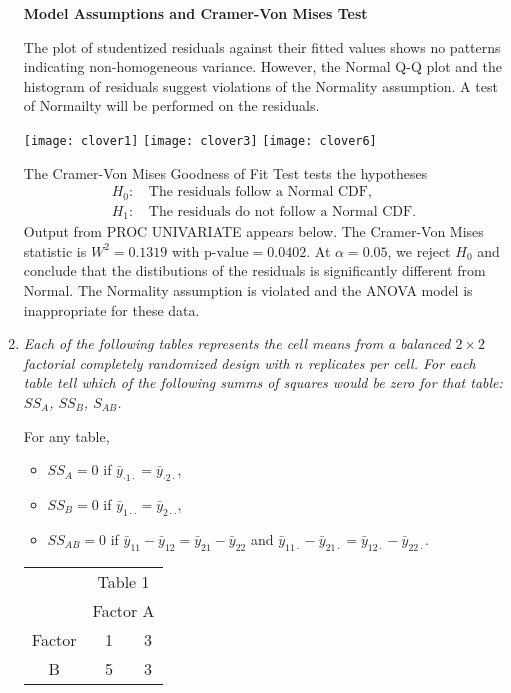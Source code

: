 \documentclass[11pt]{article}
\begin{document}
\begin{enumerate}


\pagebreak
\textbf{Model Assumptions and Cramer-Von Mises Test}

The plot of studentized residuals against their fitted values shows no
patterns indicating non-homogeneous variance. However, the Normal Q-Q plot
and the histogram of residuals suggest violations of the Normality assumption.
A test of Normailty will be performed on the residuals.

\texttt{[image: clover1]}
\texttt{[image: clover3]}
\texttt{[image: clover6]}

The Cramer-Von Mises Goodness of Fit Test tests the hypotheses
\begin{align*}
H_0\text{: }&\text{The residuals follow a Normal CDF,} \\
H_1\text{: }&\text{The residuals do not follow a Normal CDF.}
\end{align*}
Output from PROC UNIVARIATE appears below. The Cramer-Von Mises statistic
is \(W^2=0.1319\) with \(\text{p-value}=0.0402\). At \(\alpha=0.05\), we
reject \(H_0\) and conclude that the distibutions of the residuals is
significantly different from Normal. The Normality assumption is violated
and the ANOVA model is inappropriate for these data.



\pagebreak
\item %
{\it Each of the following tables represents the cell means from a balanced
\(2\times 2\) factorial completely randomized design with \(n\) replicates
per cell. For each table tell which of the following summs of squares would
be zero for that table: \(SS_A\), \(SS_B\), \(S_{AB}\).}

For any table,

\begin{itemize}
\item\(SS_A=0\) if \(\bar{y}_{\cdot 1\cdot}=\bar{y}_{\cdot 2\cdot}\),
\item\(SS_B=0\) if \(\bar{y}_{1\cdot\cdot}=\bar{y}_{2\cdot\cdot}\),
\item\(SS_{AB}=0\) if \(\bar{y}_{11}-\bar{y}_{12}=\bar{y}_{21}-\bar{y}_{22}\)
and
\(\bar{y}_{11\cdot}-\bar{y}_{21\cdot}=\bar{y}_{12\cdot}-\bar{y}_{22\cdot}\).
\end{itemize}

\begin{minipage}{0.5\linewidth}
\begin{tabular}{c|c|c|}
\multicolumn{1}{c}{} & \multicolumn{2}{c}{Table 1} \\
\multicolumn{1}{c}{} & \multicolumn{2}{c}{Factor A} \\
\cline{2-3}
Factor & ~1~ & 3 \\
\cline{2-3}
B & 5 & 3 \\
\cline{2-3}
\end{tabular}


\end{minipage}
\end{enumerate}
\end{document}
